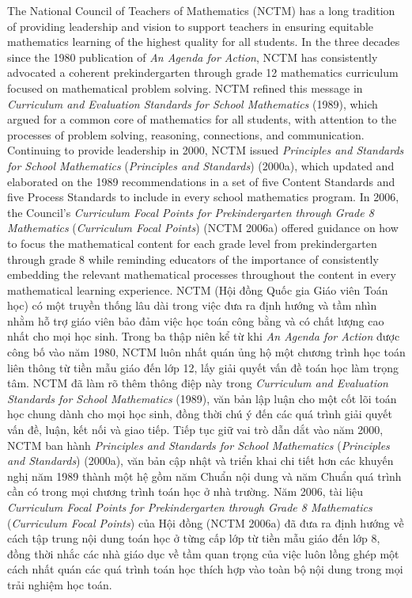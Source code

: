\documentclass[
  10pt,
  a4paper,
  landscape,
  twoside,
  openany
]{scrbook}
\newcommand{\EN}[1]{#1}
\newcommand{\VI}[1]{#1}
\begin{document}
\TriPara
{
\EN{The National Council of Teachers of Mathematics (NCTM) has a long tradition of providing leadership and vision to support teachers in ensuring equitable mathematics learning of the highest quality for all students. In the three decades since the 1980 publication of \emph{An Agenda for Action}, NCTM has consistently advocated a coherent prekindergarten through grade 12 mathematics curriculum focused on mathematical problem solving. NCTM refined this message in \emph{Curriculum and Evaluation Standards for School Mathematics} (1989), which argued for a common core of mathematics for all students, with attention to the processes of problem solving, reasoning, connections, and communication. Continuing to provide leadership in 2000, NCTM issued \emph{Principles and Standards for School Mathematics} (\emph{Principles and Standards}) (2000a), which updated and elaborated on the 1989 recommendations in a set of five Content Standards and five Process Standards to include in every school mathematics program. In 2006, the Council's \emph{Curriculum Focal Points for Prekindergarten through Grade 8 Mathematics} (\emph{Curriculum Focal Points}) (NCTM 2006a) offered guidance on how to focus the mathematical content for each grade level from prekindergarten through grade 8 while reminding educators of the importance of consistently embedding the relevant mathematical processes throughout the content in every mathematical learning experience.}
}
{
\VI{NCTM (Hội đồng Quốc gia Giáo viên Toán học) có một truyền thống lâu dài trong việc đưa ra định hướng và tầm nhìn nhằm hỗ trợ giáo viên bảo đảm việc học toán công bằng và có chất lượng cao nhất cho mọi học sinh. Trong ba thập niên kể từ khi \emph{An Agenda for Action} được công bố vào năm 1980, NCTM luôn nhất quán ủng hộ một chương trình học toán liên thông từ tiền mẫu giáo đến lớp 12, lấy giải quyết vấn đề toán học làm trọng tâm. NCTM đã làm rõ thêm thông điệp này trong \emph{Curriculum and Evaluation Standards for School Mathematics} (1989), văn bản lập luận cho một cốt lõi toán học chung dành cho mọi học sinh, đồng thời chú ý đến các quá trình giải quyết vấn đề, luận, kết nối và giao tiếp. Tiếp tục giữ vai trò dẫn dắt vào năm 2000, NCTM ban hành \emph{Principles and Standards for School Mathematics} (\emph{Principles and Standards}) (2000a), văn bản cập nhật và triển khai chi tiết hơn các khuyến nghị năm 1989 thành một hệ gồm năm Chuẩn nội dung và năm Chuẩn quá trình cần có trong mọi chương trình toán học ở nhà trường. Năm 2006, tài liệu \emph{Curriculum Focal Points for Prekindergarten through Grade 8 Mathematics} (\emph{Curriculum Focal Points}) của Hội đồng (NCTM 2006a) đã đưa ra định hướng về cách tập trung nội dung toán học ở từng cấp lớp từ tiền mẫu giáo đến lớp 8, đồng thời nhắc các nhà giáo dục về tầm quan trọng của việc luôn lồng ghép một cách nhất quán các quá trình toán học thích hợp vào toàn bộ nội dung trong mọi trải nghiệm học toán.}
}
\end{document}
